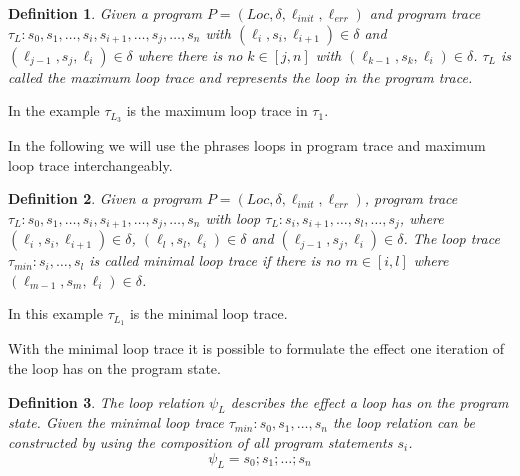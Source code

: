 \documentclass{article}
\newcommand{\Loc}{\ensuremath{\mathit{Loc}}\xspace}
\newcommand{\err}{\ensuremath{\mathit{err}}\xspace}
\newcommand{\init}{\ensuremath{\mathit{init}}\xspace}
\newcommand{\loc}[1]{\ensuremath{\ell_{#1}}\xspace}
\newcounter{example}[section]
\newtheorem{mydef}{Definition}
\newcommand\mycom[1]{}
\newcommand\mycom[1]{#1}
\newcommand{\dd}[1]{\mycom{\todo[color=orange!40,inline]{\small DD: #1}}}
\newcommand{\ts}[1]{\mycom{\todo[color=green!40,inline]{\small TS: #1}}}
\begin{document}
\begin{mydef}
	Given a program $P = (\Loc, \delta, \ell_\init, \ell_\err)$ and program trace \\ $\tau_L: s_0, s_1, \ldots, s_i, s_{i+1}, \ldots, s_j, \ldots, s_n$ with $(\loc{i}, s_i, \loc{i+1}) \in \delta$ and $(\loc{j-1}, s_j, \loc{i}) \in \delta$ where there is no $k \in [j, n]$ with $(\loc{k-1}, s_k, \loc{i}) \in \delta$. $\tau_L$ is called the maximum loop trace and represents the loop in the program trace.
\end{mydef}
\ts{In the definition above, a loop trace is a sub trace starting with the loop head.
	Shouldn't $\tau_L$ then also start with the loop head?
	Otherwise, $\tau_{L_3}$ does not match the definition.}
In the example $\tau_{L_3}$ is the maximum loop trace in $\tau_1$.
\dd{which example?}
In the following we will use the phrases loops in program trace and maximum loop trace interchangeably.

\begin{mydef}
	Given a program $P = (\Loc, \delta, \ell_\init, \ell_\err)$, program trace \\ $\tau_L: s_0, s_1, \ldots, s_i, s_{i+1}, \ldots, s_j, \ldots, s_n$ with loop $\tau_L: s_i, s_{i+1}, \ldots, s_l, \ldots, s_j$, where $(\loc{i}, s_i, \loc{i+1}) \in \delta$, $(\loc{l}, s_l, \loc{i}) \in \delta$ and $(\loc{j-1}, s_j, \loc{i}) \in \delta$. The loop trace $\tau_{min}: s_i, \ldots, s_l$ is called minimal loop trace if there is no $m \in [i, l]$ where $(\loc{m-1}, s_m, \loc{i}) \in \delta$.
\end{mydef}
\ts{Complicated. I don't think you need a loop containing another loop for this definition.}

In this example $\tau_{L_1}$ is the minimal loop trace.
\dd{which example?}

With the minimal loop trace it is possible to formulate the effect one iteration of the loop has on the program state.
\begin{mydef}
	The loop relation $\psi_L$ describes the effect a loop has on the program state.
	Given the minimal loop trace $\tau_{min}: s_0, s_1, \ldots, s_{n}$ the loop relation can be constructed by using the composition of all program statements $s_i$.
	\begin{equation*}
		\psi_L = s_0; s_1; \ldots; s_n
	\end{equation*}
\end{mydef}
\end{document}
